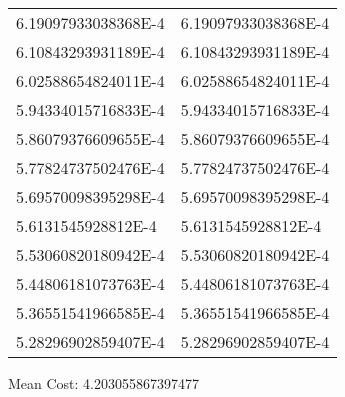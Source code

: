 \documentclass[12pt]{article}
\begin{document}
\begin{tabular}{l l}
6.19097933038368E-4	&	6.19097933038368E-4\\
6.10843293931189E-4	&	6.10843293931189E-4\\
6.02588654824011E-4	&	6.02588654824011E-4\\
5.94334015716833E-4	&	5.94334015716833E-4\\
5.86079376609655E-4	&	5.86079376609655E-4\\
5.77824737502476E-4	&	5.77824737502476E-4\\
5.69570098395298E-4	&	5.69570098395298E-4\\
5.6131545928812E-4	&	5.6131545928812E-4\\
5.53060820180942E-4	&	5.53060820180942E-4\\
5.44806181073763E-4	&	5.44806181073763E-4\\
5.36551541966585E-4	&	5.36551541966585E-4\\
5.28296902859407E-4	&	5.28296902859407E-4\\
\end{tabular}\newpage
\noindent
\noindent Mean Cost: 4.203055867397477\\
\end{document}
